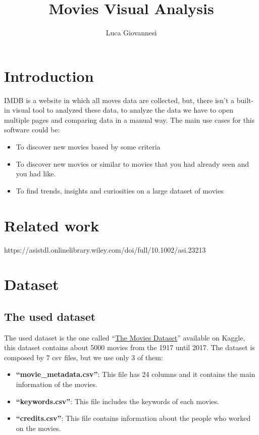 \documentclass[]{article}
\title{Movies Visual Analysis}
\author{Luca Giovannesi}
\newcommand{\quotes}[1]{``#1''}
\begin{document}
\maketitle

\section{Introduction}
IMDB is a website in which all moves data are collected, but, there isn't a built-in visual tool to analyzed these data, to analyze the data we have to open multiple pages and comparing data in a manual way.\newline
The main use cases for this software could be:
\begin{itemize}
	\item To discover new movies based by some criteria
	\item To discover new movies or similar to movies that you had already seen and you had like.
	\item To find trends, insights and curiosities on a large dataset of movies
\end{itemize}
\section{Related work}
https://asistdl.onlinelibrary.wiley.com/doi/full/10.1002/asi.23213
\section{Dataset}
\subsection{The used dataset}
The used dataset is the one called \quotes{\href{https://www.kaggle.com/datasets/rounakbanik/the-movies-dataset}{The Movies Dataset}} available on Kaggle, this dataset contains about 5000 movies from the 1917 until 2017.\newline
The dataset is composed by 7 csv files, but we use only 3 of them:
\begin{itemize}
	\item \textbf{\quotes{movie\_metadata.csv}}: This file has 24 columns and it contains the main information of the movies.
	\item \textbf{\quotes{keywords.csv}}: This file includes the keywords of each movies.
	\item \textbf{\quotes{credits.csv}}: This file contains information about the people who worked on the movies. 
\end{itemize}
\end{document}
